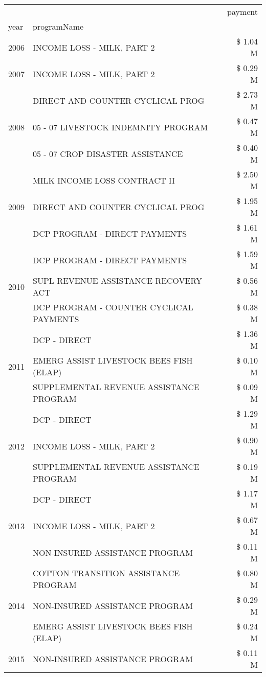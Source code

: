 \begin{tabular}{llr}
\toprule
 &  & payment \\
year & programName &  \\
\midrule
2006 & INCOME LOSS - MILK, PART 2 & \$ 1.04 M \\
\cline{1-3}
2007 & INCOME LOSS - MILK, PART 2 & \$ 0.29 M \\
\cline{1-3}
\multirow[t]{3}{*}{2008} & DIRECT AND COUNTER CYCLICAL PROG & \$ 2.73 M \\
 & 05 - 07 LIVESTOCK INDEMNITY PROGRAM & \$ 0.47 M \\
 & 05 - 07 CROP DISASTER ASSISTANCE & \$ 0.40 M \\
\cline{1-3}
\multirow[t]{3}{*}{2009} & MILK INCOME LOSS CONTRACT II & \$ 2.50 M \\
 & DIRECT AND COUNTER CYCLICAL PROG & \$ 1.95 M \\
 & DCP PROGRAM - DIRECT PAYMENTS & \$ 1.61 M \\
\cline{1-3}
\multirow[t]{3}{*}{2010} & DCP PROGRAM - DIRECT PAYMENTS & \$ 1.59 M \\
 & SUPL REVENUE ASSISTANCE RECOVERY ACT & \$ 0.56 M \\
 & DCP PROGRAM - COUNTER CYCLICAL PAYMENTS & \$ 0.38 M \\
\cline{1-3}
\multirow[t]{3}{*}{2011} & DCP - DIRECT & \$ 1.36 M \\
 & EMERG ASSIST LIVESTOCK BEES FISH (ELAP) & \$ 0.10 M \\
 & SUPPLEMENTAL REVENUE ASSISTANCE PROGRAM & \$ 0.09 M \\
\cline{1-3}
\multirow[t]{3}{*}{2012} & DCP - DIRECT & \$ 1.29 M \\
 & INCOME LOSS - MILK, PART 2 & \$ 0.90 M \\
 & SUPPLEMENTAL REVENUE ASSISTANCE PROGRAM & \$ 0.19 M \\
\cline{1-3}
\multirow[t]{3}{*}{2013} & DCP - DIRECT & \$ 1.17 M \\
 & INCOME LOSS - MILK, PART 2 & \$ 0.67 M \\
 & NON-INSURED ASSISTANCE PROGRAM & \$ 0.11 M \\
\cline{1-3}
\multirow[t]{3}{*}{2014} & COTTON TRANSITION ASSISTANCE PROGRAM & \$ 0.80 M \\
 & NON-INSURED ASSISTANCE PROGRAM & \$ 0.29 M \\
 & EMERG ASSIST LIVESTOCK BEES FISH (ELAP) & \$ 0.24 M \\
\cline{1-3}
\multirow[t]{3}{*}{2015} & NON-INSURED ASSISTANCE PROGRAM & \$ 0.11 M \\

\end{tabular}
